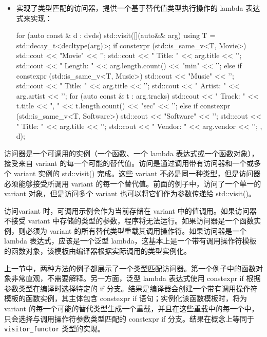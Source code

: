 \begin{itemize}
\item
实现了类型匹配的访问器，提供一个基于替代值类型执行操作的 lambda 表达式来实现：

\begin{cpp}
for (auto const & d : dvds)
{
    std::visit([](auto&& arg) {
        using T = std::decay_t<decltype(arg)>;
        if constexpr (std::is_same_v<T, Movie>)
        {
            std::cout << "Movie" << '\n';
            std::cout << " Title: " << arg.title << '\n';
            std::cout << " Length: " << arg.length.count()
                      << "min" << '\n';
        }
        else if constexpr (std::is_same_v<T, Music>)
        {
            std::cout << "Music" << '\n';
            std::cout << " Title: " << arg.title << '\n';
            std::cout << " Artist: " << arg.artist << '\n';
            for (auto const & t : arg.tracks)
            std::cout << " Track: " << t.title
                      << ", " << t.length.count()
                      << "sec" << '\n';
        }
        else if constexpr (std::is_same_v<T, Software>)
        {
            std::cout << "Software" << '\n';
            std::cout << " Title: " << arg.title << '\n';
            std::cout << " Vendor: " << arg.vendor << '\n';
        }
    },
    d);
}
\end{cpp}
\end{itemize}


访问器是一个可调用的实例（一个函数、一个 lambda 表达式或一个函数对象），接受来自 variant 的每一个可能的替代值。访问是通过调用带有访问器和一个或多个 variant 实例的 std::visit() 完成。这些 variant 不必是同一种类型，但是访问器必须能够接受所调用 variant 的每一个替代值。前面的例子中，访问了一个单一的 variant 对象，但是访问多个 variant 也可以将它们作为参数传递给 std::visit()。

访问variant 时，可调用示例会作为当前存储在 variant 中的值调用。如果访问器不接受 variant 中存储的类型的参数，程序将无法运行。如果访问器是一个函数实例，则必须为 variant 的所有替代类型重载其调用操作符。如果访问器是一个 lambda 表达式，应该是一个泛型 lambda，这基本上是一个带有调用操作符模板的函数对象，该模板由编译器根据实际调用的类型实例化。

上一节中，两种方法的例子都展示了一个类型匹配访问器。第一个例子中的函数对象非常直观，不需要解释。另一方面，泛型 lambda 表达式使用 constexpr if 根据参数类型在编译时选择特定的 if 分支。结果是编译器会创建一个带有调用操作符模板的函数实例，其主体包含 constexpr if 语句；实例化该函数模板时，将为 variant 的每一个可能的替代类型生成一个重载，并且在这些重载中的每一个中，只会选择与调用操作符参数类型匹配的 constexpr if 分支。结果在概念上等同于 \verb|visitor_functor| 类型的实现。

